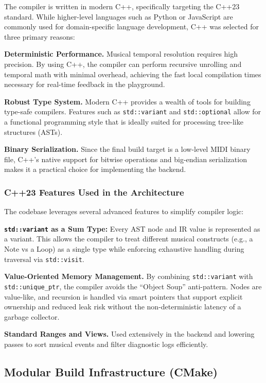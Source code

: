 The compiler is written in modern C++, specifically targeting the C++23 standard.
While higher-level languages such as Python or JavaScript are commonly used for domain-specific language
development, C++ was selected for
three primary reasons:

\noindent \textbf{Deterministic Performance.} Musical temporal resolution requires high precision.
By using C++, the compiler can perform recursive unrolling and temporal math with minimal overhead, achieving the
fast local compilation times necessary for real-time feedback in the playground.

\noindent \textbf{Robust Type System.} Modern C++ provides a wealth of tools for building type-safe compilers.
Features such as \texttt{std::variant} and \texttt{std::optional} allow for a functional programming style that is
ideally suited for processing tree-like structures (ASTs).

\noindent \textbf{Binary Serialization.} Since the final build target is a low-level MIDI binary file, C++'s native
support for
bitwise operations and big-endian serialization makes it a practical choice for implementing the backend.

\subsubsection{C++23 Features Used in the Architecture}

The codebase leverages several advanced features to simplify compiler logic:

\noindent \textbf{\texttt{std::variant} as a Sum Type:} Every AST node and IR value is represented as a variant.
This allows the compiler to treat different musical constructs (e.g., a Note vs a Loop) as a single type while
enforcing exhaustive handling during traversal via \texttt{std::visit}.

\noindent \textbf{Value-Oriented Memory Management.} By combining \texttt{std::variant} with
\texttt{std::unique\_ptr}, the
compiler avoids the ``Object Soup'' anti-pattern.
Nodes are value-like, and recursion is handled via smart pointers that support explicit ownership and reduced
leak risk without the
non-deterministic latency of a garbage collector.

\noindent \textbf{Standard Ranges and Views.} Used extensively in the backend and lowering passes to sort musical events
and filter diagnostic logs efficiently.

\subsection{Modular Build Infrastructure (CMake)}\label{detail-subsec:modular-build-infrastructure-(cmake)}


